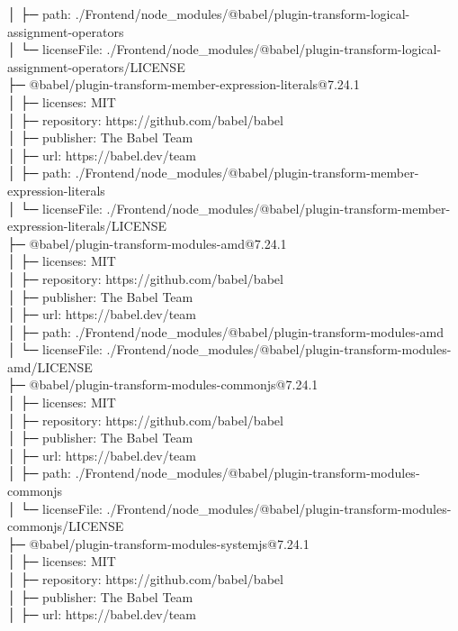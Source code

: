 │  ├─ path: ./Frontend/node\_modules/@babel/plugin-transform-logical-assignment-operators\\
│  └─ licenseFile: ./Frontend/node\_modules/@babel/plugin-transform-logical-assignment-operators/LICENSE\\
├─ @babel/plugin-transform-member-expression-literals@7.24.1\\
│  ├─ licenses: MIT\\
│  ├─ repository: https://github.com/babel/babel\\
│  ├─ publisher: The Babel Team\\
│  ├─ url: https://babel.dev/team\\
│  ├─ path: ./Frontend/node\_modules/@babel/plugin-transform-member-expression-literals\\
│  └─ licenseFile: ./Frontend/node\_modules/@babel/plugin-transform-member-expression-literals/LICENSE\\
├─ @babel/plugin-transform-modules-amd@7.24.1\\
│  ├─ licenses: MIT\\
│  ├─ repository: https://github.com/babel/babel\\
│  ├─ publisher: The Babel Team\\
│  ├─ url: https://babel.dev/team\\
│  ├─ path: ./Frontend/node\_modules/@babel/plugin-transform-modules-amd\\
│  └─ licenseFile: ./Frontend/node\_modules/@babel/plugin-transform-modules-amd/LICENSE\\
├─ @babel/plugin-transform-modules-commonjs@7.24.1\\
│  ├─ licenses: MIT\\
│  ├─ repository: https://github.com/babel/babel\\
│  ├─ publisher: The Babel Team\\
│  ├─ url: https://babel.dev/team\\
│  ├─ path: ./Frontend/node\_modules/@babel/plugin-transform-modules-commonjs\\
│  └─ licenseFile: ./Frontend/node\_modules/@babel/plugin-transform-modules-commonjs/LICENSE\\
├─ @babel/plugin-transform-modules-systemjs@7.24.1\\
│  ├─ licenses: MIT\\
│  ├─ repository: https://github.com/babel/babel\\
│  ├─ publisher: The Babel Team\\
│  ├─ url: https://babel.dev/team\\
